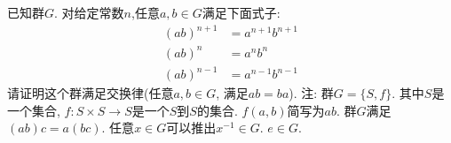\documentclass{article}
\begin{document}
已知群$G$.
对给定常数$n$,任意$a, b\in G$满足下面式子:
\begin{align}
  (ab)^{n+1} &= a^{n+1}b^{n+1} \\
  (ab)^{n} &= a^{n}b^{n} \\
  (ab)^{n-1} &= a^{n-1}b^{n-1} 
\end{align}
请证明这个群满足交换律(任意$a, b\in G$, 满足$ab = ba$).
注:
群$G = \{S, f\}$.
其中$S$是一个集合, $f:S\times S\to S$是一个$S$到$S$的集合.
$f(a, b)$简写为$ab$. 群$G$满足$(ab)c = a(bc)$.
任意$x\in G$可以推出$x^{-1}\in G$.
$e\in G$.
\end{document}
